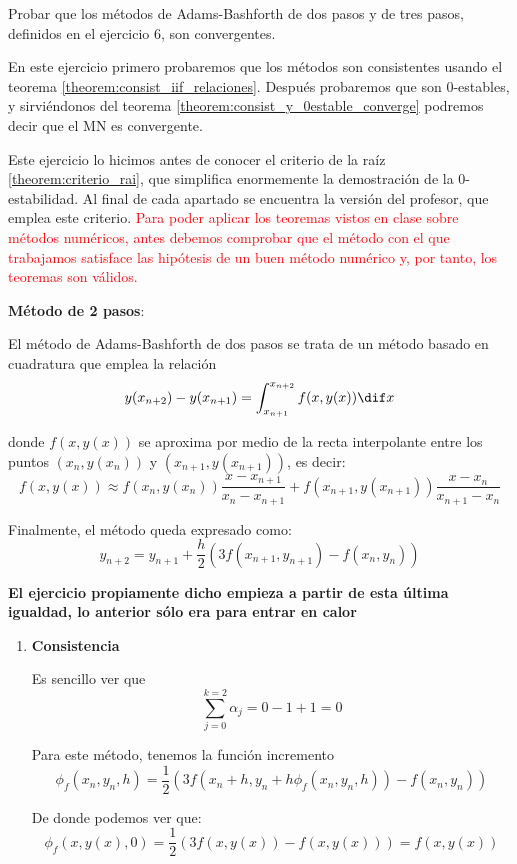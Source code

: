 \begin{problem}[8]
Probar que los métodos de Adams-Bashforth de dos pasos y de tres pasos, definidos en el ejercicio 6, son convergentes.
\solution
{}

En este ejercicio primero probaremos que los métodos son consistentes usando el teorema \ref{theorem:consist_iif_relaciones}. Después probaremos que son 0-estables, y sirviéndonos del teorema \ref{theorem:consist_y_0estable_converge} podremos decir que el MN es convergente.

Este ejercicio lo hicimos antes de conocer el criterio de la raíz \ref{theorem:criterio_rai}, que simplifica enormemente la demostración de la 0-estabilidad. Al final de cada apartado se encuentra la versión del profesor, que emplea este criterio.
\textcolor{red}{
\obs Para poder aplicar los teoremas vistos en clase sobre métodos numéricos, antes debemos comprobar que el método con el que trabajamos satisface las hipótesis de un buen método numérico y, por tanto, los teoremas son válidos.}

\spart \textbf{Método de 2 pasos}:

El método de Adams-Bashforth de dos pasos se trata de un método basado en cuadratura que emplea la relación
\[y(x_{n+2}) - y(x_{n+1}) = \int_{x_{n+1}}^{x_{n+2}} f(x,y(x)) \dif x\]

donde $f(x,y(x))$ se aproxima por medio de la recta interpolante entre los puntos $(x_n,y(x_n))$ y $(x_{n+1},y(x_{n+1}))$, es decir:
\[f(x,y(x)) \approx f(x_n, y(x_n)) \frac{x-x_{n+1}}{x_n-x_{n+1}}+f(x_{n+1},y(x_{n+1}))\frac{x-x_n}{x_{n+1}-x_n}\]

Finalmente, el método queda expresado como:
\[y_{n+2} = y_{n+1}+\frac{h}{2}\left( 3f(x_{n+1},y_{n+1})-f(x_n,y_n)\right)\]

\textbf{El ejercicio propiamente dicho empieza a partir de esta última igualdad, lo anterior sólo era para entrar en calor}

\begin{enumerate}
\item \textbf{Consistencia}

Es sencillo ver que \[\sum_{j=0}^{k=2} α_j = 0 - 1 + 1 = 0\]

Para este método, tenemos la función incremento
\[\phi_f(x_n,y_n,h) = \frac{1}{2}\left(3f(x_n+h,y_n+h\phi_f(x_n,y_n,h))-f(x_n,y_n)\right)\]

De donde podemos ver que:
\[\phi_f(x,y(x),0) = \frac{1}{2} \left(3f(x,y(x)) - f(x,y(x)) \right) = f(x,y(x))\]


\end{enumerate}
\end{problem}

